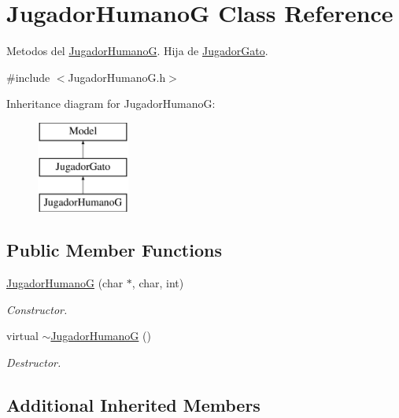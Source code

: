 \hypertarget{class_jugador_humano_g}{}\section{Jugador\+HumanoG Class Reference}
\label{class_jugador_humano_g}


Metodos del \hyperlink{class_jugador_humano_g}{Jugador\+HumanoG}. Hija de \hyperlink{class_jugador_gato}{Jugador\+Gato}.  




{\ttfamily \#include $<$Jugador\+Humano\+G.\+h$>$}

Inheritance diagram for Jugador\+HumanoG\+:\begin{figure}[H]
\begin{center}
\leavevmode
\includegraphics[height=3.000000cm]{class_jugador_humano_g}
\end{center}
\end{figure}
\subsection*{Public Member Functions}
\begin{DoxyCompactItemize}
\item 
\hyperlink{class_jugador_humano_g_a83d1be7d6e1365740c5d3aaf2083882d}{Jugador\+HumanoG} (char $\ast$, char, int)
\begin{DoxyCompactList}\small\item\em Constructor. \end{DoxyCompactList}\item 
virtual \hyperlink{class_jugador_humano_g_abf6b59a6720c3797cca328f49b06bf14}{$\sim$\+Jugador\+HumanoG} ()\hypertarget{class_jugador_humano_g_abf6b59a6720c3797cca328f49b06bf14}{}\label{class_jugador_humano_g_abf6b59a6720c3797cca328f49b06bf14}

\begin{DoxyCompactList}\small\item\em Destructor. \end{DoxyCompactList}\end{DoxyCompactItemize}
\subsection*{Additional Inherited Members}


